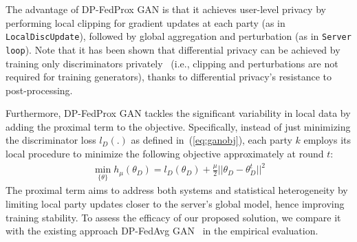 \documentclass[conference]{IEEEtran}
\begin{document}
The advantage of DP-FedProx GAN is that it achieves user-level privacy by performing local clipping for gradient updates at each party (as in \texttt{LocalDiscUpdate}), followed by global aggregation and perturbation (as in \texttt{Server loop}).  Note that it has been shown that differential privacy can be achieved by training only discriminators privately~\cite{DPGANXie2018} (i.e., clipping and perturbations are not required for training generators), thanks to differential privacy's resistance to post-processing. 

Furthermore, DP-FedProx GAN tackles the significant variability in local data by adding the proximal term to the objective. %
Specifically, instead of just minimizing the discriminator loss $l_{D}(.)$ as defined in~(\ref{eq:ganobj}), each party $k$ employs its local procedure to minimize the following objective approximately at round $t$:
\begin{equation}\label{eq:proxloss}
	\begin{multlined}
         \min_{\{\theta\}} h_{\mu}(\theta_D) = l_{D}(\theta_D) + \frac{\mu}{2} || \theta_D-\theta^{t}_{D} ||^2
	\end{multlined}
\end{equation}
The proximal term aims to address both systems and statistical heterogeneity by limiting local party updates closer to the server's global model, hence improving training stability. To assess the efficacy of our proposed solution, we compare it with the existing approach DP-FedAvg GAN~\cite{FedavgGAN2019} in the empirical evaluation. 
\end{document}
